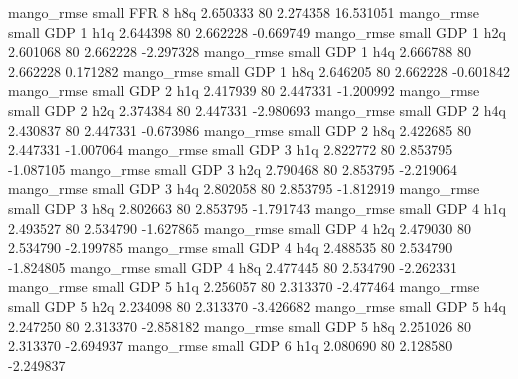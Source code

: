        mango_rmse      small      FFR                 8                  h8q 2.650333 80       2.274358          16.531051
       mango_rmse      small      GDP                 1                  h1q 2.644398 80       2.662228          -0.669749
       mango_rmse      small      GDP                 1                  h2q 2.601068 80       2.662228          -2.297328
       mango_rmse      small      GDP                 1                  h4q 2.666788 80       2.662228           0.171282
       mango_rmse      small      GDP                 1                  h8q 2.646205 80       2.662228          -0.601842
       mango_rmse      small      GDP                 2                  h1q 2.417939 80       2.447331          -1.200992
       mango_rmse      small      GDP                 2                  h2q 2.374384 80       2.447331          -2.980693
       mango_rmse      small      GDP                 2                  h4q 2.430837 80       2.447331          -0.673986
       mango_rmse      small      GDP                 2                  h8q 2.422685 80       2.447331          -1.007064
       mango_rmse      small      GDP                 3                  h1q 2.822772 80       2.853795          -1.087105
       mango_rmse      small      GDP                 3                  h2q 2.790468 80       2.853795          -2.219064
       mango_rmse      small      GDP                 3                  h4q 2.802058 80       2.853795          -1.812919
       mango_rmse      small      GDP                 3                  h8q 2.802663 80       2.853795          -1.791743
       mango_rmse      small      GDP                 4                  h1q 2.493527 80       2.534790          -1.627865
       mango_rmse      small      GDP                 4                  h2q 2.479030 80       2.534790          -2.199785
       mango_rmse      small      GDP                 4                  h4q 2.488535 80       2.534790          -1.824805
       mango_rmse      small      GDP                 4                  h8q 2.477445 80       2.534790          -2.262331
       mango_rmse      small      GDP                 5                  h1q 2.256057 80       2.313370          -2.477464
       mango_rmse      small      GDP                 5                  h2q 2.234098 80       2.313370          -3.426682
       mango_rmse      small      GDP                 5                  h4q 2.247250 80       2.313370          -2.858182
       mango_rmse      small      GDP                 5                  h8q 2.251026 80       2.313370          -2.694937
       mango_rmse      small      GDP                 6                  h1q 2.080690 80       2.128580          -2.249837
